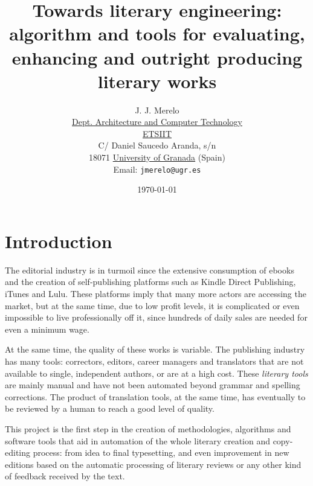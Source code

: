 \documentclass[a4paper,12pt,twocolumn]{article}
\title{Towards literary engineering: algorithm and tools for
  evaluating, enhancing and outright producing literary works}
\author{J. J. Merelo\\
\href{http://atc.ugr.es}{Dept. Architecture and Computer Technology}\\
\href{http://etsiit.ugr.es}{ETSIIT}\\
C/ Daniel Saucedo Aranda, s/n\\
18071 \href{http://www.ugr.es}{University of Granada} (Spain)\\
Email: {\tt jmerelo@ugr.es}}
\date{\today}
\begin{document}
\section{Introduction}

The editorial industry is in turmoil since the extensive consumption
of ebooks and the creation of self-publishing platforms such as Kindle
Direct Publishing, iTunes and Lulu. These platforms imply that many more actors are accessing the market, but at the same time, due to low profit levels, it is complicated or even impossible to live professionally off it, since hundreds of daily sales are needed for even a minimum wage.

At the same time, the quality of these works is variable. The
publishing industry has many tools: correctors, editors, career
managers and translators that are not available to single, independent
authors, or are at a high cost. These {\em literary tools} are mainly manual and have not been
automated beyond grammar and spelling corrections. The product of translation tools,
at the same time, has eventually to be reviewed by a human to reach a
good level of quality.

This project is the first step in the creation of methodologies, algorithms and
software tools that aid in automation of the whole literary creation and
copy-editing process: from idea to final typesetting, and even improvement in new editions
based on the automatic processing of literary reviews or any other
kind of feedback received by the text.
\end{document}
